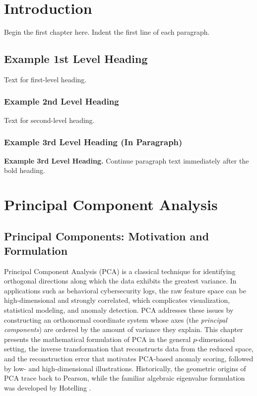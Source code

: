\documentclass[12pt]{report}
\begin{document}
\newpage


\chapter{Introduction}

Begin the first chapter here. Indent the first line of each paragraph.

\section{Example 1st Level Heading}

Text for first-level heading.

\subsection{Example 2nd Level Heading}

Text for second-level heading.

\subsection*{Example 3rd Level Heading (In Paragraph)}

\noindent \textbf{Example 3rd Level Heading.} Continue paragraph text immediately after the bold heading.

\newpage

\chapter{Principal Component Analysis}
\label{ch:pca}

\section{Principal Components: Motivation and Formulation}
Principal Component Analysis (PCA) is a classical technique for identifying
orthogonal directions along which the data exhibits the greatest variance. In applications such as behavioral cybersecurity logs,
the raw feature space can be high-dimensional and strongly correlated, which complicates
visualization, statistical modeling, and anomaly detection. PCA addresses these issues by
constructing an orthonormal coordinate system whose axes (the \emph{principal components})
are ordered by the amount of variance they explain. This chapter presents the mathematical
formulation of PCA in the general $p$-dimensional setting, the inverse transformation that
reconstructs data from the reduced space, and the reconstruction error that motivates PCA-based
anomaly scoring, followed by low- and high-dimensional illustrations. Historically,
the geometric origins of PCA trace back to Pearson, while the familiar algebraic
eigenvalue formulation was developed by Hotelling \cite{pearson1901,hotelling1933,jolliffe1986}.
\end{document}
